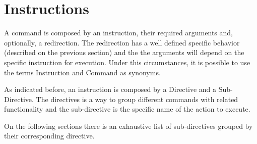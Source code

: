 \chapter{Instructions}
\label{ch:instructions}

A command is composed by an instruction, their required arguments and, optionally, a redirection. The redirection has a well defined specific behavior (described on the previous section) and the the arguments will depend on the specific instruction for execution. Under this circumstances, it is possible to use the terms Instruction and Command as synonyms.

As indicated before, an instruction is composed by a Directive and a Sub-Directive. The directives is a way to group different commands with related functionality and the sub-directive is the specific name of the action to execute.

On the following sections there is an exhaustive list of sub-directives grouped by their corresponding directive.



\newpage